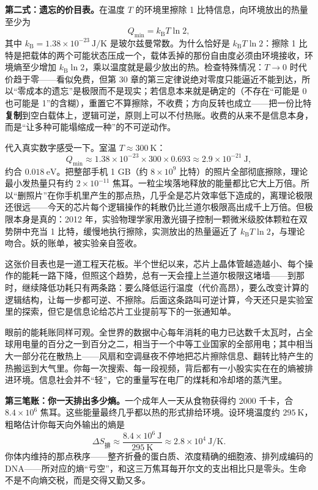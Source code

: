 \textbf{第二式：遗忘的价目表。}在温度 $T$ 的环境里擦除 1 比特信息，向环境放出的热量至少为
\[
Q_{\min}=k_{\mathrm{B}}T\ln 2 ,
\]
其中 $k_{\mathrm{B}}=1.38\times10^{-23}\ \mathrm{J/K}$ 是玻尔兹曼常数。为什么恰好是 $k_{\mathrm{B}}T\ln 2$：擦除 1 比特是把载体的两个可能状态压成一个，载体丢掉的那份自由度必须由环境接收，环境熵至少增加 $k_{\mathrm{B}}\ln 2$，乘以温度就是最少放出的热。检查特殊情况：$T\to 0$ 时代价趋于零——看似免费，但第 30 章的第三定律说绝对零度只能逼近不能到达，所以“零成本的遗忘”是极限而不是现实；若信息本来就是确定的（不存在“可能是 0 也可能是 1”的含糊），重置它不算擦除，不收费；方向反转也成立——把一份比特\textbf{复制}到空白载体上，逻辑可逆，原则上可以不付热账。收费的从来不是信息本身，而是“让多种可能塌缩成一种”的不可逆动作。

代入真实数字感受一下。室温 $T\approx300\ \mathrm{K}$：
\[
Q_{\min}\approx1.38\times10^{-23}\times300\times0.693\approx2.9\times10^{-21}\ \mathrm{J},
\]
约合 $0.018\ \mathrm{eV}$。把整部手机 1 GB（约 $8\times10^9$ 比特）的照片全部彻底擦除，理论最小发热量只有约 $2\times10^{-11}$ 焦耳。一粒尘埃落地释放的能量都比它大上万倍。所以“删照片”在你手机里产生的那点热，几乎全是芯片效率低下造成的，离理论极限还很远——今天的芯片每个逻辑操作的耗散仍比兰道尔极限高出成千上万倍。但极限本身是真的：2012 年，实验物理学家用激光镊子控制一颗微米级胶体颗粒在双势阱中充当 1 比特，缓慢地执行擦除，实测放出的热量逼近了 $k_{\mathrm{B}}T\ln 2$，与理论吻合。妖的账单，被实验亲自签收。

这张价目表也是一道工程天花板。半个世纪以来，芯片上晶体管越造越小、每个操作的能耗一路下降，但照这个趋势，总有一天会撞上兰道尔极限这堵墙——到那时，继续降低功耗只有两条路：要么降低运行温度（代价高昂），要么改变计算的逻辑结构，让每一步都可逆、不擦除。后面这条路叫可逆计算，今天还只是实验室里的探索，但它是信息论给芯片工业提前写下的一张通知单。

眼前的能耗账同样可观。全世界的数据中心每年消耗的电力已达数千太瓦时，占全球用电量的百分之一到百分之二，相当于一个中等工业国家的全部用电；其中相当大一部分花在散热上——风扇和空调昼夜不停地把芯片擦除信息、翻转比特产生的热搬运到大气里。你每一次搜索、每一段视频，背后都有一小股实实在在的熵被排进环境。信息社会并不“轻”，它的重量写在电厂的煤耗和冷却塔的蒸汽里。

\textbf{第三笔账：你一天排出多少熵。}一个成年人一天从食物获得约 2000 千卡，合 $8.4\times10^6$ 焦耳。这些能量最终几乎都以热的形式排给环境。设环境温度约 $295\ \mathrm{K}$，粗略估计你每天向外输出的熵是
\[
\Delta S_{\text{排}}\approx\frac{8.4\times10^6\ \mathrm{J}}{295\ \mathrm{K}}\approx2.8\times10^4\ \mathrm{J/K}.
\]
你体内维持的那点秩序——整齐折叠的蛋白质、浓度精确的细胞液、排列成编码的 DNA——所对应的熵“亏空”，和这三万焦耳每开尔文的支出相比只是零头。生命不是不向熵交税，而是交得又勤又多。

